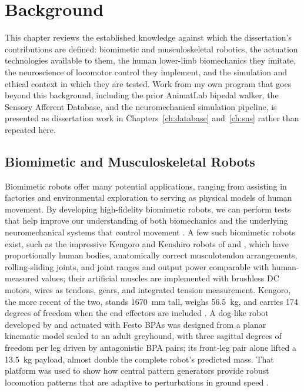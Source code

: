 \chapter{Background}\label{ch:background}
\graphicspath{{D:/Github/Bipedal_Robot/Documentation/Reports and Papers/Dissertation/Figures/15-background/}{figs/15-background/}}

This chapter reviews the established knowledge against which the dissertation's contributions are defined: biomimetic and musculoskeletal robotics, the actuation technologies available to them, the human lower-limb biomechanics they imitate, the neuroscience of locomotor control they implement, and the simulation and ethical context in which they are tested. Work from my own program that goes beyond this background, including the prior AnimatLab bipedal walker, the Sensory Afferent Database, and the neuromechanical simulation pipeline, is presented as dissertation work in Chapters~\ref{ch:database} and~\ref{ch:sns} rather than repeated here.

\section{Biomimetic and Musculoskeletal Robots}\label{sec:bg_robots}

Biomimetic robots offer many potential applications, ranging from assisting in factories and environmental exploration to serving as physical models of human movement. By developing high-fidelity biomimetic robots, we can perform tests that help improve our understanding of both biomechanics and the underlying neuromechanical systems that control movement \citep{shin_constructive_2018, asano_musculoskeletal_2019, ijspeert_amphibious_2020, goldsmith_investigating_2021, hunt_development_2017, schilling_adaptive_2022}. A few such biomimetic robots exist, such as the impressive Kengoro and Kenshiro robots of \citet{asano_design_2017} and \citet{asano_musculoskeletal_2019}, which have proportionally human bodies, anatomically correct musculotendon arrangements, rolling-sliding joints, and joint ranges and output power comparable with human-measured values; their artificial muscles are implemented with brushless DC motors, wires as tendons, gears, and integrated tension measurement. Kengoro, the more recent of the two, stands \qty{1670}{\mm} tall, weighs \qty{56.5}{\kg}, and carries 174 degrees of freedom when the end effectors are included \citep{asano_design_2017}. A dog-like robot developed by \citet{aschenbeck_design_2006} and actuated with Festo BPAs was designed from a planar kinematic model scaled to an adult greyhound, with three sagittal degrees of freedom per leg driven by antagonistic BPA pairs; its front-leg pair alone lifted a \qty{13.5}{\kg} payload, almost double the complete robot's predicted mass. That platform was used to show how central pattern generators provide robust locomotion patterns that are adaptive to perturbations in ground speed \citep{hunt_development_2017}.

